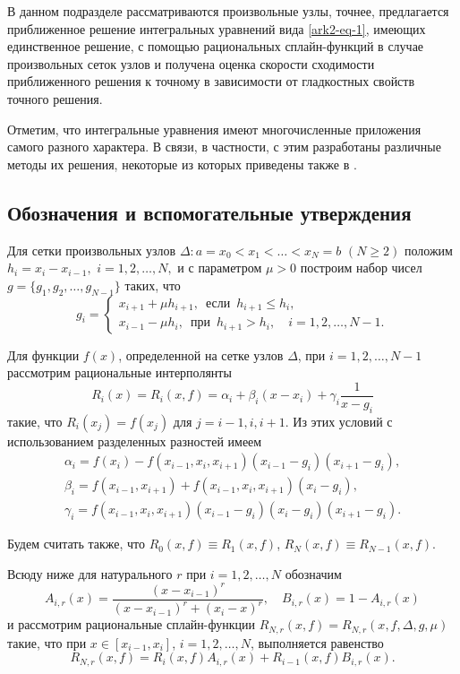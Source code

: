 В данном подразделе рассматриваются произвольные узлы, точнее, предлагается приближенное
решение интегральных уравнений вида \eqref{ark2-eq-1}, имеющих единственное решение, с помощью
 рациональных сплайн-функций в случае произвольных сеток узлов и получена оценка
 скорости сходимости приближенного решения к точному в зависимости от гладкостных
 свойств точного решения.

Отметим, что интегральные уравнения имеют многочисленные приложения самого разного
характера. В связи, в частности, с этим разработаны различные методы их решения, некоторые
из которых приведены также в \cite{ark-1,ark-2,ark-3}.


\subsection{Обозначения и вспомогательные утверждения}

Для сетки произвольных узлов $\Delta: a=x_0<x_1<\dots<x_N=b$ $(N\geqslant 2)$ положим
$h_i=x_i-x_{i-1},$ $i=1,2,\dots,N,$ и с параметром  $\mu>0$ построим набор чисел
$g=\{g_1,g_2, \dots,g_{N-1}\}$ таких, что
\begin{equation}\label{ark2-eq-2}
g_i=\begin{cases}
x_{i+1}+\mu h_{i+1}, \,\text{ если }\, h_{i+1}\leqslant h_i,\\
x_{i-1}-\mu h_i, \,\text{ при }\, h_{i+1}> h_i, \quad i=1,2,\dots,N-1.
\end{cases}
\end{equation}

Для функции $f(x)$, определенной на сетке узлов $\Delta$,
при $i=1,2,\dots,N-1$
рассмотрим рациональные интерполянты
\begin{equation}\label{ark2-eq-3}
R_i(x)=R_i(x,f)=\alpha_i+\beta_i(x-x_i)+\gamma_i\frac 1{x-g_i}
\end{equation}
такие, что $R_i(x_j)=f(x_j)$ для $j=i-1,i,i+1$. Из этих условий с использованием
 разделенных разностей имеем
$$
\begin{array}{lcl}
\alpha_i=f(x_i)-f(x_{i-1}, x_i, x_{i+1})(x_{i-1}-g_i)(x_{i+1}-g_i),\\
\beta_i=f(x_{i-1}, x_{i+1})+f(x_{i-1}, x_i, x_{i+1})(x_i-g_i),\\
\gamma_i=f(x_{i-1}, x_i, x_{i+1})(x_{i-1}-g_i)(x_i-g_i)(x_{i+1}-g_i).
\end{array}
$$

Будем считать также, что $R_0(x,f)\equiv R_1(x,f)$, $R_N(x,f)\equiv R_{N-1}(x,f)$.

Всюду ниже для натурального $r$ при $i=1,2,\dots,N$ обозначим
$$
A_{i,r}(x)=\frac{(x-x_{i-1})^r}{(x-x_{i-1})^r+(x_i-x)^r},\quad B_{i,r}(x)=1-A_{i,r}(x)
$$
 и рассмотрим рациональные  сплайн-функции
$R_{N,r}(x,f)=R_{N,r}(x,f,\Delta,g,\mu)$ такие, что при $x\in [x_{i-1}, x_i]$,
 $i=1,2,\dots,N$, выполняется равенство
\begin{equation}\label{ark2-eq-4}
R_{N,r}(x,f)=R_i(x,f)A_{i,r}(x)+R_{i-1}(x,f)B_{i,r}(x).
\end{equation}


